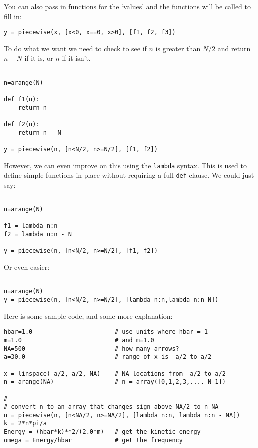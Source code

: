 \documentclass[11pt]{article} %
\begin{document}
You can also pass in functions for the `values' and the functions will be called to fill in:

\begin{verbatim}
y = piecewise(x, [x<0, x==0, x>0], [f1, f2, f3])
\end{verbatim}

To do what we want we need to check to see if $n$ is greater than $N/2$ and return $n-N$ if it is, or $n$ if it isn't.

\begin{verbatim}

n=arange(N)

def f1(n):
    return n

def f2(n):
    return n - N
	
y = piecewise(n, [n<N/2, n>=N/2], [f1, f2])

\end{verbatim}

However, we can even improve on this using the {\tt lambda} syntax. This is used to define simple functions in place without requiring a full {\tt def} clause. We could just say:

\begin{verbatim}

n=arange(N)

f1 = lambda n:n
f2 = lambda n:n - N
	
y = piecewise(n, [n<N/2, n>=N/2], [f1, f2])

\end{verbatim}

Or even easier:

\begin{verbatim}

n=arange(N)
y = piecewise(n, [n<N/2, n>=N/2], [lambda n:n,lambda n:n-N])

\end{verbatim}


Here is some sample code, and some more explanation:

\begin{verbatim}
hbar=1.0                       # use units where hbar = 1
m=1.0                          # and m=1.0
NA=500                         # how many arrows?
a=30.0                         # range of x is -a/2 to a/2

x = linspace(-a/2, a/2, NA)    # NA locations from -a/2 to a/2
n = arange(NA)                 # n = array([0,1,2,3,.... N-1])

#
# convert n to an array that changes sign above NA/2 to n-NA
n = piecewise(n, [n<NA/2, n>=NA/2], [lambda n:n, lambda n:n - NA])
k = 2*n*pi/a
Energy = (hbar*k)**2/(2.0*m)   # get the kinetic energy
omega = Energy/hbar            # get the frequency
\end{verbatim}
\end{document}
